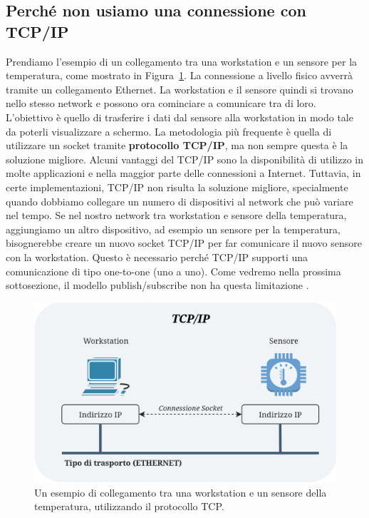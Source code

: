 \subsection{Perché non usiamo una connessione con TCP/IP}
Prendiamo l'esempio di un collegamento tra una workstation e 
un sensore per la temperatura, come mostrato in 
Figura~\ref{TCP connection}. La connessione a livello fisico
avverrà tramite un collegamento Ethernet. La workstation e il 
sensore quindi si trovano nello stesso network e possono 
ora cominciare a comunicare tra di loro. L'obiettivo è quello
di trasferire i dati dal sensore alla workstation in modo tale
da poterli visualizzare a schermo.
La metodologia più frequente è quella di utilizzare un socket tramite 
\textbf{protocollo TCP/IP}, ma non sempre questa è la soluzione migliore.
Alcuni vantaggi del TCP/IP sono la disponibilità di utilizzo 
in molte applicazioni e nella maggior parte 
delle connessioni a Internet.
Tuttavia, in certe implementazioni, TCP/IP non risulta la soluzione migliore,
specialmente quando dobbiamo collegare un numero di dispositivi al 
network che può variare nel tempo. Se nel nostro network tra workstation e 
sensore della temperatura, aggiungiamo un altro dispositivo, ad esempio un 
sensore per la temperatura, bisognerebbe creare un nuovo socket 
TCP/IP per far comunicare il nuovo sensore con la workstation.
Questo è necessario perché TCP/IP supporti una comunicazione di tipo 
one-to-one (uno a uno). Come vedremo nella prossima sottosezione,
il modello publish/subscribe non ha questa limitazione \cite{1494965}.



\begin{figure}[H]
    \centering
    \includegraphics[width=12cm, keepaspectratio]{img/TCP connessione-Pagina-2.jpg}
    \caption{Un esempio di collegamento tra una workstation e un sensore della temperatura,
    utilizzando il protocollo TCP.}
    \label{TCP connection}
\end{figure}



